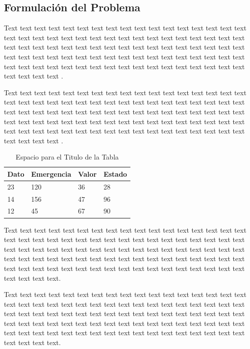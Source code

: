 \documentclass[12pt,a4paper]{article}
\begin{document}
\subsection{Formulación del Problema}
\label{sec:2}
Text text text text text text text text text text text text text text text text text text text text text text text text text text text text text text text text text text text text text text text text text text text text text text text text text text text text text text text text text text text text text text text text text text text text text text text text text text text text text text text text text text text text text text text text text \cite{Inga2023}.

Text text text text text text text text text text text text text text text text text text text text text text text text text text text text text text text text text text text text text text text text text text text text text text text text text text text text text text text text text text text text text text text text text text text text text text text text text text text text text text text text text text text text text text text text text \cite{Annersten2006}.


\begin{table}[H]
\centering
\caption{Espacio para el Titulo de la Tabla}
\label{tabB}
\begin{tabular}{llll}
Dato & Emergencia & Valor & Estado \\
\hline
23   & 120        & 36    & 28     \\
\hline
14   & 156        & 47    & 96     \\
\hline
12   & 45         & 67    & 90   \\
\hline
\end{tabular}
\end{table}


Text text text text text text text text text text text text text text text text text text text text text text text text text text text text text text text text text text text text text text text text text text text text text text text text text text text text text text text text text text text text text text text text text text text text text text text text text text text text text text text text text text text text text text text text text.

Text text text text text text text text text text text text text text text text text text text text text text text text text text text text text text text text text text text text text text text text text text text text text text text text text text text text text text text text text text text text text text text text text text text text text text text text text text text text text text text text text text text text text text text text text.
\end{document}
